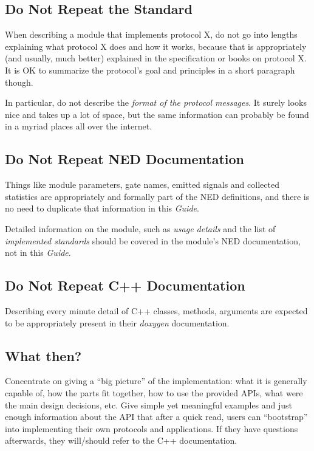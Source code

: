\subsection{Do Not Repeat the Standard}
\label{sec:authorsguide:do-not-repeat-standard}

When describing a module that implements protocol X, do not go
into lengths explaining what protocol X does and how it works,
because that is appropriately (and usually, much better) explained 
in the specification or books on protocol X. It is OK to summarize
the protocol's goal and principles in a short paragraph though.

In particular, do not describe the \textit{format of the protocol messages}.
It surely looks nice and takes up a lot of space, but the same information
can probably be found in a myriad places all over the internet.

\subsection{Do Not Repeat NED Documentation}
\label{sec:authorsguide:do-not-repeat-neddoc}

Things like module parameters, gate names, emitted signals and collected 
statistics are appropriately and formally part of the NED definitions,
and there is no need to duplicate that information in this \textit{Guide}.

Detailed information on the module, such as \textit{usage details} and the 
list of \textit{implemented standards} should be covered in the module's 
NED documentation, not in this \textit{Guide}.

\subsection{Do Not Repeat C++ Documentation}
\label{sec:authorsguide:do-not-repeat-cpp}

Describing every minute detail of C++ classes, methods, arguments are
expected to be appropriately present in their \textit{doxygen}
documentation.

\subsection{What then?}
\label{sec:authorsguide:what-then}

Concentrate on giving a ``big picture'' of the implementation: what it is
generally capable of, how the parts fit together, how to use the provided APIs,
what were the main design decisions, etc. Give simple yet meaningful examples
and just enough information about the API that after a quick read, users can
``bootstrap'' into implementing their own protocols and applications. If they
have questions afterwards, they will/should refer to the C++ documentation.



